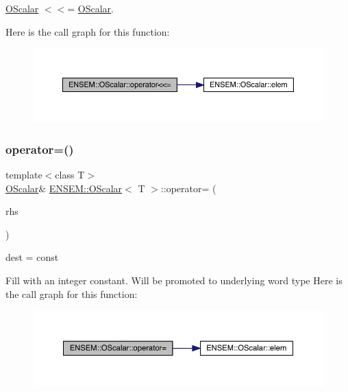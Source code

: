 \mbox{\hyperlink{classENSEM_1_1OScalar}{O\+Scalar}} $<$$<$= \mbox{\hyperlink{classENSEM_1_1OScalar}{O\+Scalar}}. 

Here is the call graph for this function\+:
\nopagebreak
\begin{figure}[H]
\begin{center}
\leavevmode
\includegraphics[width=350pt]{da/d80/classENSEM_1_1OScalar_a93607b92c63ae779d9d3ed131df3f449_cgraph}
\end{center}
\end{figure}
\mbox{\label{classENSEM_1_1OScalar_a88bbb49d2879dba60c29d7792a8af8dc}} 
\subsubsection{\texorpdfstring{operator=()}{operator=()}\hspace{0.1cm}{\footnotesize\ttfamily [1/12]}}
{\footnotesize\ttfamily template$<$class T$>$ \\
\mbox{\hyperlink{classENSEM_1_1OScalar}{O\+Scalar}}\& \mbox{\hyperlink{classENSEM_1_1OScalar}{E\+N\+S\+E\+M\+::\+O\+Scalar}}$<$ T $>$\+::operator= (\begin{DoxyParamCaption}\item[{const typename \mbox{\hyperlink{structENSEM_1_1WordType}{Word\+Type}}$<$ T $>$\+::Type\+\_\+t \&}]{rhs }\end{DoxyParamCaption})\hspace{0.3cm}{\ttfamily [inline]}}



dest = const 

Fill with an integer constant. Will be promoted to underlying word type Here is the call graph for this function\+:
\nopagebreak
\begin{figure}[H]
\begin{center}
\leavevmode
\includegraphics[width=350pt]{da/d80/classENSEM_1_1OScalar_a88bbb49d2879dba60c29d7792a8af8dc_cgraph}
\end{center}
\end{figure}
\mbox{\label{classENSEM_1_1OScalar_a88bbb49d2879dba60c29d7792a8af8dc}} 
